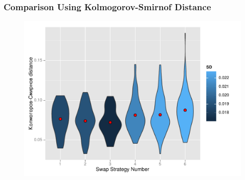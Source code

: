 \documentclass[xetex]{beamer}
\begin{document}
	\begin{frame}[t]\frametitle{Comparison Using Kolmogorov-Smirnof Distance}

		\begin{center}
			\begin{figure}
				\includegraphics[height=.8\textheight, keepaspectratio]{./picts/KS}
			\end{figure}	
		\end{center}	    

	
	\end{frame}
	
\end{document}
